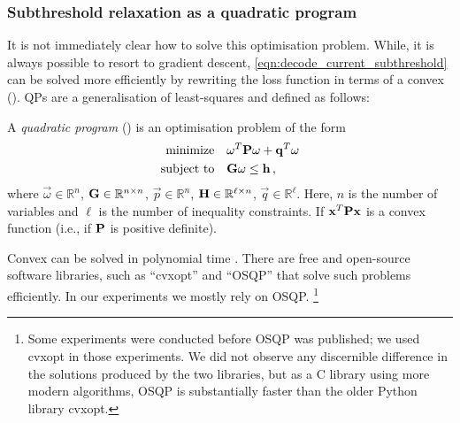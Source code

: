 \subsubsection{Subthreshold relaxation as a quadratic program}
It is not immediately clear how to solve this optimisation problem.
While, it is always possible to resort to gradient descent, \cref{eqn:decode_current_subthreshold} can be solved more efficiently by rewriting the loss function in terms of a convex \qprog (\QP).
QPs are a generalisation of least-squares and defined as follows:
\begin{definition}
\label{def:qp}
A \emph{quadratic program} (\QP) is an optimisation problem of the form \citep[adapted in slightly simplified form from][Section~4.4]{boyd2004convex}
\begin{align*}
	\text{minimize} &\quad
		\mathbf{\omega}^T \mathbf{P} \mathbf{\omega} + \mathbf{q}^T \mathbf{\omega} \\
	\text{subject to} &\quad
		\mathbf{G} \mathbf{\omega} \leq \mathbf{h} \,,
\end{align*}
where $\vec \omega \in \mathbb{R}^{n}$, $\mathbf{G} \in \mathbb{R}^{n \times n}$, $\vec p \in \mathbb{R}^{n}$, $\mathbf{H} \in \mathbb{R}^{\ell \times n}$, $\vec q \in \mathbb{R}^{\ell}$.
Here, $n$ is the number of variables and $\ell$ is the number of inequality constraints.
If $\mathbf{x}^T \mathbf{P} \mathbf{x}$ is a convex function (i.e., if $\mathbf{P}$ is positive definite).
\end{definition}

Convex \qprogpl can be solved in polynomial time \citep{kozlov1980polynomial}.
There are free and open-source software libraries, such as \enquote{cvxopt} \citep{vandenberghe2010cvxopt} and \enquote{OSQP}  \citep{stellato2020osqp} that solve such problems efficiently.
In our experiments we mostly rely on OSQP.%
\footnote{Some experiments were conducted before OSQP was published; we used cvxopt in those experiments. We did not observe any discernible difference in the solutions produced by the two libraries, but as a C library using more modern algorithms, OSQP is substantially faster than the older Python library cvxopt.}

